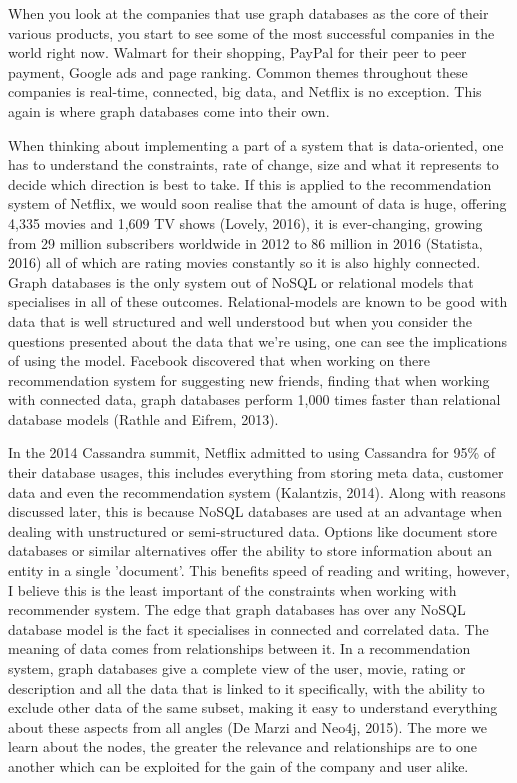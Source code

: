 \documentclass[a4paper]{article}
\begin{document}
When you look at the companies that use graph databases as the core of their various products, you start to see some of the most successful companies in the world right now. Walmart for their shopping, PayPal for their peer to peer payment, Google ads and page ranking. Common themes throughout these companies is real-time, connected, big data, and Netflix is no exception. This again is where graph databases come into their own.

When thinking about implementing a part of a system that is data-oriented, one has to understand the constraints, rate of change, size and what it represents to decide which direction is best to take. If this is applied to the recommendation system of Netflix, we would soon realise that the amount of data is huge, offering 4,335 movies and 1,609 TV shows (Lovely, 2016), it is ever-changing, growing from 29 million subscribers worldwide in 2012 to 86 million in 2016 (Statista, 2016) all of which are rating movies constantly so it is also highly connected. Graph databases is the only system out of NoSQL or relational models that specialises in all of these outcomes. Relational-models are known to be good with data that is well structured and well understood but when you consider the questions presented about the data that we're using, one can see the implications of using the model. Facebook discovered that when working on there recommendation system for suggesting new friends, finding that when working with connected data, graph databases perform 1,000 times faster than relational database models (Rathle and Eifrem, 2013).

In the 2014 Cassandra summit, Netflix admitted to using Cassandra for 95\% of their database usages, this includes everything from storing meta data, customer data and even the recommendation system (Kalantzis, 2014). Along with reasons discussed later, this is because NoSQL databases are used at an advantage when dealing with unstructured or semi-structured data. Options like document store databases or similar alternatives offer the ability to store information about an entity in a single 'document'. This benefits speed of reading and writing, however, I believe this is the least important of the constraints when working with recommender system. The edge that graph databases has over any NoSQL database model is the fact it specialises in connected and correlated data. The meaning of data comes from relationships between it. In a recommendation system, graph databases give a complete view of the user, movie, rating or description and all the data that is linked to it specifically, with the ability to exclude other data of the same subset, making it easy to understand everything about these aspects from all angles (De Marzi and Neo4j, 2015). The more we learn about the nodes, the greater the relevance and relationships are to one another which can be exploited for the gain of the company and user alike. \par
\end{document}
